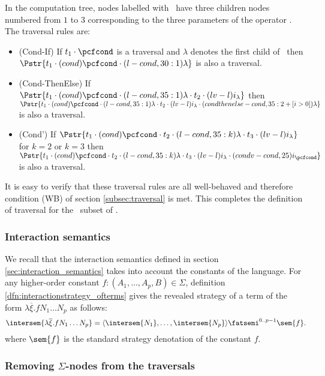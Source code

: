 \noindent In the computation tree, nodes labelled with \pcfcond\
have three children nodes numbered from $1$ to $3$ corresponding to
the three parameters of the operator \pcfcond. The traversal rules
are:
\begin{itemize}
\item (Cond-If) If $t_1 \cdot \pcfcond$ is a traversal and $\lambda$ denotes the first child of \pcfcond\ then
$\Pstr{ t_1 \cdot (cond){{\pcfcond}} \cdot (l-cond,30:1){\lambda}}$
 is also a traversal.

\item (Cond-ThenElse) If
$\Pstr{t_1 \cdot (cond){\pcfcond} \cdot (l-cond,35:1){\lambda} \cdot t_2
\cdot (lv-l){i_{\lambda}}} $
then $\Pstr{t_1 \cdot
(cond){\pcfcond} \cdot (l-cond,35:1){\lambda} \cdot t_2 \cdot
(lv-l){i_{\lambda}} \cdot (condthenelse-cond,35:{2+[i>0]}){\lambda} }
$
is also a traversal.



\item (Cond') If
$\Pstr{t_1 \cdot (cond){\pcfcond} \cdot t_2 \cdot (l-cond,35:k){\lambda}
\cdot t_3 \cdot (lv-l){i_{\lambda}}}$
 for $k=2$ or $k=3$ then  $\Pstr{ t_1 \cdot
(cond){\pcfcond} \cdot t_2 \cdot (l-cond,35:k){\lambda} \cdot t_3
\cdot (lv-l){i_{\lambda}} \cdot (condv-cond,25){i_{\pcfcond}}}$
 is also a traversal.
\end{itemize}
It is easy to verify that these traversal rules are all well-behaved
and therefore condition (WB) of section \ref{subsec:traversal} is
met. This completes the definition of traversal for the \pcf\ subset
of \ialgol.

\subsubsection{Interaction semantics}
We recall that the interaction semantics defined in section
\ref{sec:interaction_semantics} takes into account the constants
of the language. For any higher-order constant $f : (A_1,\ldots,A_p,B) \in \Sigma$, definition \ref{dfn:interactionstrategy_ofterms} gives the  revealed strategy of a term of the form $\lambda \overline{\xi}. f N_1 \ldots
N_p$ as follows:
$$ \intersem{\lambda \overline{\xi}. f N_1 \ldots N_p} = \langle \intersem{N_1}, \ldots, \intersem{N_p} \rangle \fatsemi^{0..p-1} \sem{f}.$$
where $\sem{f}$ is the standard strategy denotation of the constant $f$.


\subsubsection{Removing $\Sigma$-nodes from the traversals}


